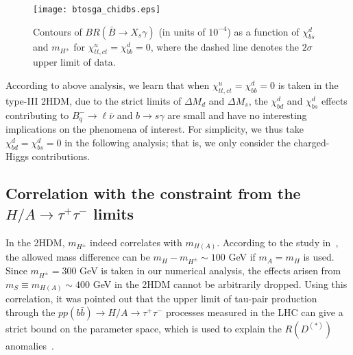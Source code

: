 \documentclass[prd,preprint,superscriptaddress,amsmath,amssymb]{revtex4}
\begin{document}
  
\begin{figure}[phtb]
\texttt{[image: btosga\_chidbs.eps]}
\caption{  Contours of  $BR(\bar B \to X_s \gamma)$ (in units of $10^{-4}$) as a function of $\chi^d_{bs}$ and $m_{H^\pm}$ for $\chi^u_{tt,ct}=\chi^d_{bb}=0$, where the dashed line denotes the $2\sigma$ upper limit of data.}
\label{fig:bsga_chidbs}
\end{figure} 

 
  According to above analysis, we learn that when $\chi^u_{tt,ct}=\chi^d_{bb}=0$ is taken in the type-III 2HDM, due to the strict limits of $\Delta M_{d}$ and $\Delta M_s$, the $\chi^d_{bd}$ and $\chi^d_{bs}$ effects contributing to $B^-_q \to \ell \bar \nu$ and $b\to s \gamma$ are small and have no interesting implications on the phenomena of interest.  For simplicity, we thus take $\chi^d_{bd}= \chi^d_{bs} = 0$  in the following analysis; that is, we only consider the charged-Higgs contributions. 
  
   \subsection{Correlation with the constraint from the  $H/A \to \tau^+ \tau^-$ limits }
 
 In the 2HDM, $m_{H^\pm}$ indeed correlates with $m_{H(A)}$. According to the study in~\cite{Benbrik:2015evd}, the allowed mass difference can be $m_H - m_{H^\pm} \sim 100$ GeV if $m_A = m_H$ is used.  Since $m_{H^\pm}=300$ GeV is taken in our numerical analysis, the effects arisen from $m_S\equiv m_{H(A)}\sim 400$ GeV   in the 2HDM cannot be arbitrarily dropped. Using this correlation, it was pointed out  that the upper limit of  tau-pair production through the $pp(b\bar{b})\to H/A\to \tau^+ \tau^-$ processes measured in the LHC can give a strict bound on the parameter space, which is used to explain the $R(D^{(*)})$ anomalies~\cite{Faroughy:2016osc}. 
 
\end{document}
